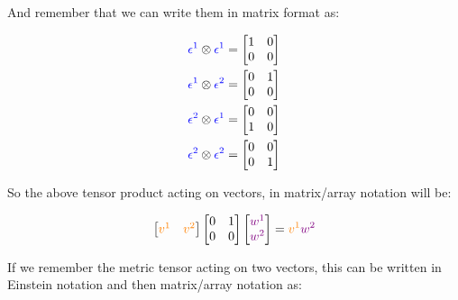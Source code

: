 And remember that we can write them in matrix format as:

\begin{align*}
    \begingroup\color{blue}\epsilon^1\endgroup \otimes \begingroup\color{blue}\epsilon^1\endgroup = \begin{bmatrix}
        1 & 0\\
        0 & 0
    \end{bmatrix}\\
    \begingroup\color{blue}\epsilon^1\endgroup \otimes \begingroup\color{blue}\epsilon^2\endgroup = \begin{bmatrix}
        0 & 1\\
        0 & 0
    \end{bmatrix}\\
    \begingroup\color{blue}\epsilon^2\endgroup \otimes \begingroup\color{blue}\epsilon^1\endgroup = \begin{bmatrix}
        0 & 0\\
        1 & 0
    \end{bmatrix}\\
    \begingroup\color{blue}\epsilon^2\endgroup \otimes \begingroup\color{blue}\epsilon^2\endgroup = \begin{bmatrix}
        0 & 0\\
        0 & 1
    \end{bmatrix}
\end{align*}

So the above tensor product acting on vectors, in matrix/array notation will be:

\begin{equation}
    \begin{bmatrix}
        \begingroup\color{orange}v^1\endgroup & \begingroup\color{orange}v^2\endgroup
    \end{bmatrix}
    \begin{bmatrix}
        0 & 1\\
        0 & 0
    \end{bmatrix}
    \begin{bmatrix}
        \begingroup\color{violet}w^1\endgroup \\
        \begingroup\color{violet}w^2\endgroup
    \end{bmatrix} = \begingroup\color{orange}v^1\endgroup \begingroup\color{violet}w^2\endgroup
\end{equation}

If we remember the metric tensor acting on two vectors, this can be written in Einstein notation and then matrix/array notation as:

